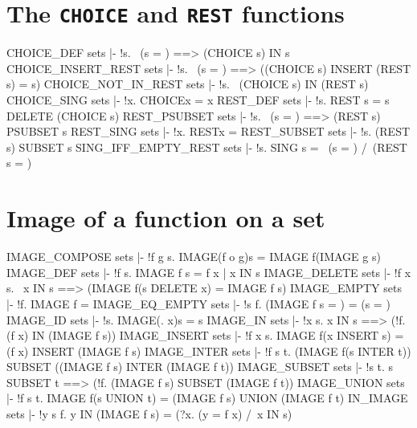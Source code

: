 \section{The {\tt CHOICE} and {\tt REST} functions}
\THEOREM CHOICE\_DEF sets
|- !s. ~(s = {}) ==> (CHOICE s) IN s
\ENDTHEOREM
\THEOREM CHOICE\_INSERT\_REST sets
|- !s. ~(s = {}) ==> ((CHOICE s) INSERT (REST s) = s)
\ENDTHEOREM
\THEOREM CHOICE\_NOT\_IN\_REST sets
|- !s. ~(CHOICE s) IN (REST s)
\ENDTHEOREM
\THEOREM CHOICE\_SING sets
|- !x. CHOICE{x} = x
\ENDTHEOREM
\THEOREM REST\_DEF sets
|- !s. REST s = s DELETE (CHOICE s)
\ENDTHEOREM
\THEOREM REST\_PSUBSET sets
|- !s. ~(s = {}) ==> (REST s) PSUBSET s
\ENDTHEOREM
\THEOREM REST\_SING sets
|- !x. REST{x} = {}
\ENDTHEOREM
\THEOREM REST\_SUBSET sets
|- !s. (REST s) SUBSET s
\ENDTHEOREM
\THEOREM SING\_IFF\_EMPTY\_REST sets
|- !s. SING s = ~(s = {}) /\ (REST s = {})
\ENDTHEOREM
\section{Image of a function on a set}
\THEOREM IMAGE\_COMPOSE sets
|- !f g s. IMAGE(f o g)s = IMAGE f(IMAGE g s)
\ENDTHEOREM
\THEOREM IMAGE\_DEF sets
|- !f s. IMAGE f s = {f x | x IN s}
\ENDTHEOREM
\THEOREM IMAGE\_DELETE sets
|- !f x s. ~x IN s ==> (IMAGE f(s DELETE x) = IMAGE f s)
\ENDTHEOREM
\THEOREM IMAGE\_EMPTY sets
|- !f. IMAGE f{} = {}
\ENDTHEOREM
\THEOREM IMAGE\_EQ\_EMPTY sets
|- !s f. (IMAGE f s = {}) = (s = {})
\ENDTHEOREM
\THEOREM IMAGE\_ID sets
|- !s. IMAGE(\x. x)s = s
\ENDTHEOREM
\THEOREM IMAGE\_IN sets
|- !x s. x IN s ==> (!f. (f x) IN (IMAGE f s))
\ENDTHEOREM
\THEOREM IMAGE\_INSERT sets
|- !f x s. IMAGE f(x INSERT s) = (f x) INSERT (IMAGE f s)
\ENDTHEOREM
\THEOREM IMAGE\_INTER sets
|- !f s t. (IMAGE f(s INTER t)) SUBSET ((IMAGE f s) INTER (IMAGE f t))
\ENDTHEOREM
\THEOREM IMAGE\_SUBSET sets
|- !s t. s SUBSET t ==> (!f. (IMAGE f s) SUBSET (IMAGE f t))
\ENDTHEOREM
\THEOREM IMAGE\_UNION sets
|- !f s t. IMAGE f(s UNION t) = (IMAGE f s) UNION (IMAGE f t)
\ENDTHEOREM
\THEOREM IN\_IMAGE sets
|- !y s f. y IN (IMAGE f s) = (?x. (y = f x) /\ x IN s)
\ENDTHEOREM
